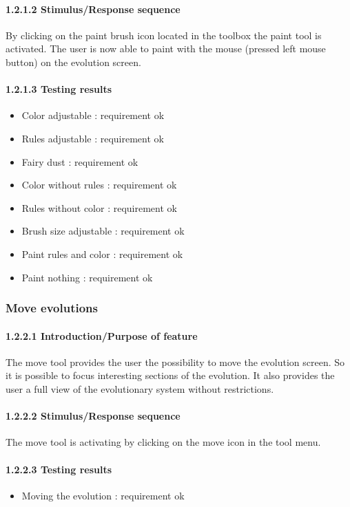 \documentclass[titlepage,12pt]{scrartcl}
\begin{document}
\paragraph{1.2.1.2 Stimulus/Response sequence}
By clicking on the paint brush icon located in the toolbox the paint tool is activated.
The user is now able to paint with the mouse (pressed left mouse button) on the evolution screen.

\paragraph{1.2.1.3 Testing results}
\begin{itemize}
\item Color adjustable			:	requirement ok
\item Rules adjustable			: requirement ok
\item Fairy dust						:	requirement ok
\item Color without rules		:	requirement ok
\item Rules without color		:	requirement ok
\item Brush size adjustable	:	requirement ok
\item Paint rules and color		:	requirement ok
\item Paint nothing					: requirement ok
\end{itemize}





\subsubsection{Move evolutions}

\paragraph{1.2.2.1 Introduction/Purpose of feature}
The move tool provides the user the possibility to move the evolution screen. So it is possible to focus interesting sections of the evolution. It also provides the user a full view of the evolutionary system without restrictions.

\paragraph{1.2.2.2 Stimulus/Response sequence}
The move tool is activating by clicking on the move icon in the tool menu.

\paragraph{1.2.2.3 Testing results}
\begin{itemize}
	\item Moving the evolution 	: requirement ok
\end{itemize}
\end{document}
